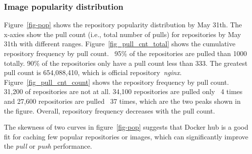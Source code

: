 
\subsubsection{Image popularity distribution}

Figure~\ref{fig-pop} shows the repository popularity distribution by May 31th. The x-axies show the pull count (i.e., total number of pulls) for repositories by May 31th with different ranges.
Figure~\ref{fig_pull_cnt_total} shows the cumulative repository frequency by pull count. ~95\% of the repositories are pulled than 1000 totally. 90\% of the repositories only have a pull count less than 333. The greatest pull count is 654,088,410, which is official repository~\textit{nginx}. 
Figure~\ref{fig_pull_cnt_count} shows the repository frequency by pull count. 31,200 of repositories are not at all.  
34,100 repositories are pulled only ~4 times and 27,600 repositories are pulled ~37 times, which are the two peaks shown in the figure.
Overall, repository frequency decreases with the pull count.

The skewness of two curves in figure~\ref{fig-pop} suggests that Docker hub is a good fit for caching few popular repositories or images, which can significantly improve the \textit{pull} or \textit{push} performance.      


